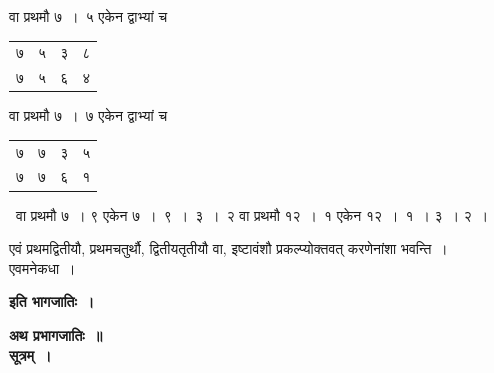 \documentclass[11pt, openany]{book}
\begin{document}
\begin{minipage}[]{0.6\textwidth}
वा प्रथमौ ७~।~५ एकेन द्वाभ्यां च 
\end{minipage}
\begin{minipage}[]{0.4\textwidth}
	\begin{tabular}{|c|c|c|c|}
		\hline
		७ & ५& ३ & ८\\
		७  & ५& ६ & ४\\
	\hline
	\end{tabular}
\end{minipage}
\vspace{2mm}

वा प्रथमौ ७~।~७ एकेन द्वाभ्यां च ~
	\begin{tabular}{|c|c|c|c|}
		\hline
		७ & ७& ३ & ५\\
		७  & ७& ६ & १\\
		\hline
	\end{tabular}
~वा प्रथमौ ७~। ९ एकेन ७~।~९~।~३~।~२ वा प्रथमौ १२~।~१ एकेन १२~।~१~। ३~। २~।

\newpage

एवं प्रथमद्वितीयौ, प्रथमचतुर्थौ, द्वितीयतृतीयौ वा, इष्टावंशौ प्रकल्प्योक्तवत् करणेनांशा भवन्ति~। एवमनेकधा~। 
\begin{center}
\textbf{इति भागजातिः~। }
\end{center}

\textbf{अथ प्रभागजातिः~॥}\\ 

\textbf{सूत्रम्~।} 
\end{document}
